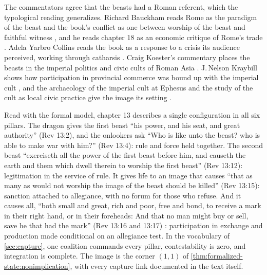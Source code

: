 \documentclass[11pt,letterpaper]{article}
\theoremstyle{definition}
\theoremstyle{remark}
\begin{document}
The commentators agree that the beasts had a Roman referent, which the typological reading generalizes. Richard Bauckham reads Rome as the paradigm of the beast and the book's conflict as one between worship of the beast and faithful witness \citep{bauckham1993}, and he reads chapter 18 as an economic critique of Rome's trade \citep{bauckham1991}. Adela Yarbro Collins reads the book as a response to a crisis its audience perceived, working through catharsis \citep{collins1984}. Craig Koester's commentary places the beasts in the imperial politics and civic cults of Roman Asia \citep{koester2014}. J.\,Nelson Kraybill shows how participation in provincial commerce was bound up with the imperial cult \citep{kraybill1996}, and the archaeology of the imperial cult at Ephesus and the study of the cult as local civic practice give the image its setting \citep{friesen2001,price1984}.

Read with the formal model, chapter 13 describes a single configuration in all six pillars. The dragon gives the first beast ``his power, and his seat, and great authority'' (Rev 13:2), and the onlookers ask ``Who is like unto the beast? who is able to make war with him?'' (Rev 13:4): rule and force held together. The second beast ``exerciseth all the power of the first beast before him, and causeth the earth and them which dwell therein to worship the first beast'' (Rev 13:12): legitimation in the service of rule. It gives life to an image that causes ``that as many as would not worship the image of the beast should be killed'' (Rev 13:15): sanction attached to allegiance, with no forum for those who refuse. And it causes all, ``both small and great, rich and poor, free and bond, to receive a mark in their right hand, or in their foreheads: And that no man might buy or sell, save he that had the mark'' (Rev 13:16 and 13:17) \citep{kjv}: participation in exchange and production made conditional on an allegiance test. In the vocabulary of \cref{sec:capture}, one coalition commands every pillar, contestability is zero, and integration is complete. The image is the corner $(1,1)$ of \cref{thm:formalized-state:nonimplication}, with every capture link documented in the text itself.
\end{document}
